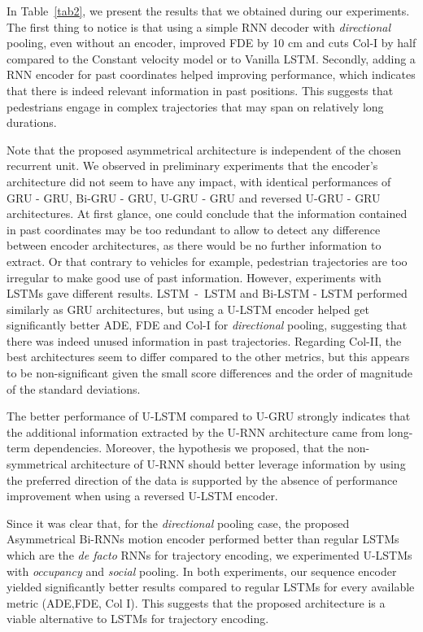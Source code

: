 \documentclass[conference]{IEEEtran}
\begin{document}
In Table~\ref{tab2}, we present the results that we obtained during our experiments. The first thing to notice is that using a simple RNN decoder with \textit{directional} pooling, even without an encoder, improved FDE by 10 cm and cuts Col-I by half compared to the Constant velocity model or to Vanilla LSTM. Secondly, adding a RNN encoder for past coordinates helped improving performance, which indicates that there is indeed relevant information in past positions. This suggests that pedestrians engage in complex trajectories that may span on relatively long durations.

Note that the proposed asymmetrical architecture is independent of the chosen recurrent unit. We observed in preliminary experiments that the encoder's architecture did not seem to have any impact, with identical performances of GRU - GRU, Bi-GRU - GRU, U-GRU - GRU and reversed U-GRU - GRU architectures. At first glance, one could conclude that the information contained in past coordinates may be too redundant to allow to detect any difference between encoder architectures, as there would be no further information to extract. Or that contrary to vehicles for example, pedestrian trajectories are too irregular to make good use of past information. However, experiments with LSTMs gave different results. LSTM~-~LSTM and Bi-LSTM - LSTM performed similarly as GRU architectures, but using a U-LSTM encoder helped get significantly better ADE, FDE and Col-I for \textit{directional} pooling, suggesting that there was indeed unused information in past trajectories. Regarding Col-II, the best architectures seem to differ compared to the other metrics, but this appears to be non-significant given the small score differences and the order of magnitude of the standard deviations.




The better performance of U-LSTM compared to U-GRU strongly indicates that the additional information extracted by the U-RNN architecture came from long-term dependencies. Moreover, the hypothesis we proposed, that the non-symmetrical architecture of U-RNN should better leverage information by using the preferred direction of the data is supported by the absence of performance improvement when using a reversed U-LSTM encoder.

Since it was clear that, for the \textit{directional} pooling case, the proposed Asymmetrical Bi-RNNs motion encoder performed better than regular LSTMs  which are the \textit{de facto} RNNs for trajectory encoding, we experimented U-LSTMs with \textit{occupancy} and \textit{social} pooling. In both experiments, our sequence encoder yielded significantly better results compared to regular LSTMs for every available metric (ADE,FDE, Col I). This suggests that the proposed architecture is a viable alternative to LSTMs for trajectory encoding.
\end{document}
